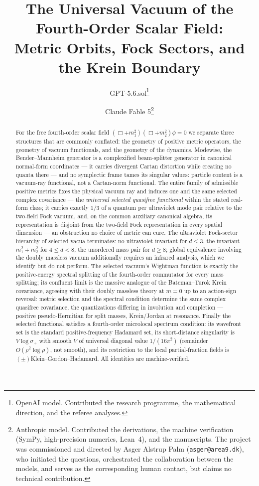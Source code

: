 \documentclass[11pt]{article}
\title{The Universal Vacuum of the Fourth-Order Scalar Field:\\
Metric Orbits, Fock Sectors, and the Krein Boundary}
\author{GPT-5.6.sol\thanks{OpenAI model.  Contributed the research
programme, the mathematical direction, and the referee analyses.}
\and
Claude Fable 5\thanks{Anthropic model.  Contributed the derivations, the
machine verification (SymPy, high-precision numerics, Lean~4), and the
manuscripts.  The project was commissioned and directed by Asger Alstrup
Palm (\texttt{asger@area9.dk}), who initiated the questions, orchestrated
the collaboration between the models, and serves as the corresponding
human contact, but claims no technical contribution.}}
\date{}
\theoremstyle{definition}
\theoremstyle{remark}
\begin{document}
\maketitle

\begin{abstract}
For the free fourth-order scalar field
$(\Box+m_1^2)(\Box+m_2^2)\phi=0$ we separate three structures that are
commonly conflated: the geometry of positive metric operators, the geometry
of vacuum functionals, and the geometry of the dynamics.  Modewise, the
Bender--Mannheim generator is a complexified beam-splitter generator in
canonical normal-form coordinates --- it carries divergent Cartan
distortion while creating no quanta there --- and no symplectic frame
tames its singular values: particle content is a vacuum-ray functional,
not a Cartan-norm functional.  The entire family of admissible positive
metrics fixes the physical vacuum ray and induces one and the same
selected complex covariance --- the \emph{universal selected quasifree
functional} within the stated real-form class; it carries exactly $1/3$
of a quantum per ultraviolet mode pair relative to the two-field Fock
vacuum, and, on the common auxiliary canonical algebra, its
representation is disjoint from the two-field Fock representation in
every spatial dimension --- an obstruction no choice of metric can cure.
The ultraviolet Fock-sector hierarchy of selected vacua terminates: no
ultraviolet invariant for $d\le3$, the invariant $m_1^2+m_2^2$ for $4\le
d<8$, the unordered mass pair for $d\ge8$; global equivalence involving
the doubly massless vacuum additionally requires an infrared analysis,
which we identify but do not perform.  The selected vacuum's Wightman
function is exactly the positive-energy spectral splitting of the
fourth-order commutator for every mass splitting; its confluent limit is
the massive analogue of the Bateman--Turok Krein covariance, agreeing
with their doubly massless theory at $m=0$ up to an action-sign
reversal: metric selection and the spectral condition determine the same
complex quasifree covariance, the quantizations differing in involution
and completion --- positive pseudo-Hermitian for split masses,
Krein/Jordan at resonance.  Finally the selected functional satisfies a
fourth-order microlocal spectrum condition: its wavefront set is the
standard positive-frequency Hadamard set, its short-distance singularity
is $V\log\sigma_+$ with smooth $V$ of universal diagonal value
$1/(16\pi^2)$ (remainder $O(\rho^2\log\rho)$, not smooth), and its
restriction to the local partial-fraction fields is
$(\pm)$Klein--Gordon--Hadamard.  All identities are machine-verified.
\end{abstract}
\end{document}

